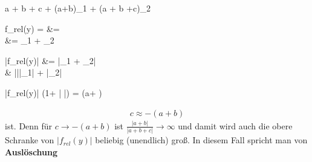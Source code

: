 \documentclass[13pt]{scrreprt}
\begin{document}
\begin{abox}
	 \overset{\cdot}{=}  a + b + c + (a+b)\cdot\epsilon_1 + (a + b +c)\cdot\epsilon_2
\end{abox}

\begin{abox}
	f_{rel}(y) =  &= \\
	&= \cdot\epsilon_1 + \epsilon_2
\end{abox}

\begin{abox}
	|f_{rel}(y)| &= |\cdot\epsilon_1 + \epsilon_2|\\ & ||\cdot|\epsilon_1| + |\epsilon_2|
\end{abox}

\begin{abox}
	|f_{rel}(y)| \leqslant (1+ | |) \cdot \epsilon = (a+ ) \cdot \epsilon
\end{abox}

\begin{tbox}
	\begin{align*}
	c \approx -(a+b)
	\end{align*}
	ist. Denn für $c \rightarrow -(a+b)$ ist $ \frac{|a+b|}{|a+b+c|} \rightarrow \infty$ und damit wird auch die obere Schranke von $|f_{rel}(y)|$ beliebig (unendlich) groß. In diesem Fall spricht man von \textbf{Auslöschung}
\end{tbox}
\end{document}
